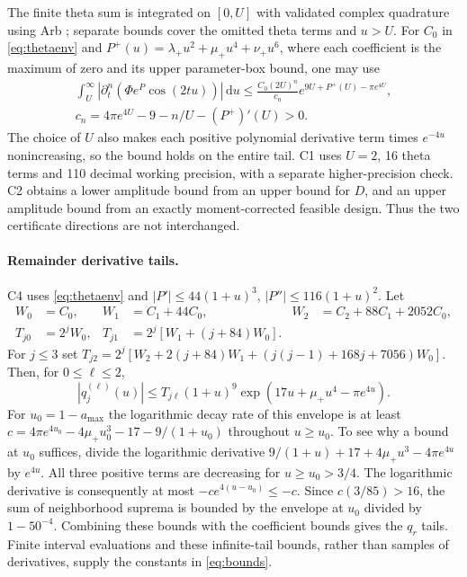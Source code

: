 \documentclass[11pt,a4paper]{article}
\numberwithin{equation}{section}
\theoremstyle{remark}\newtheorem{remark}[theorem]{Remark}
\newcommand{\dd}{\,\mathrm du}
\begin{document}
The finite theta sum is integrated on $[0,U]$ with validated complex
quadrature using Arb \cite{johansson,johanssonintegration}; separate bounds
cover the omitted theta terms and $u>U$. For $C_0$ in
\eqref{eq:thetaenv} and $P^+(u)=\lambda_+u^2+\mu_+u^4+\nu_+u^6$, where
each coefficient is the maximum of zero and its upper parameter-box bound,
one may use
\begin{equation}
 \begin{gathered}
 \int_U^\infty |\partial_t^n(\Phi e^P\cos(2tu))|\dd
 \le\frac{C_0(2U)^n}{c_n}e^{9U+P^+(U)-\pi e^{4U}},\\
 c_n=4\pi e^{4U}-9-n/U-(P^+)'(U)>0.
 \end{gathered}
\end{equation}
The choice of $U$ also makes each positive polynomial derivative term
times $e^{-4u}$ nonincreasing, so the bound holds on the entire tail.
C1 uses $U=2$, 16 theta terms and 110 decimal working precision, with a
separate higher-precision check. C2 obtains a lower amplitude bound from
an upper bound for $D$, and an upper amplitude bound from an exactly
moment-corrected feasible design. Thus the two certificate directions
are not interchanged.

\paragraph{Remainder derivative tails.}
C4 uses \eqref{eq:thetaenv} and $|P'|\le44(1+u)^3$,
$|P''|\le116(1+u)^2$. Let
\begin{align}
 W_0&=C_0,& W_1&=C_1+44C_0,& W_2&=C_2+88C_1+2052C_0,\\
 T_{j0}&=2^jW_0,& T_{j1}&=2^j[W_1+(j+84)W_0].
\end{align}
For $j\le3$ set
$T_{j2}=2^j[W_2+2(j+84)W_1+(j(j-1)+168j+7056)W_0]$.
Then, for $0\le\ell\le2$,
\begin{equation}
 |q_j^{(\ell)}(u)|\le T_{j\ell}(1+u)^9
 \exp(17u+\mu_+u^4-\pi e^{4u}).
\end{equation}
For $u_0=1-a_{\max}$ the logarithmic decay rate of this envelope is at
least $c=4\pi e^{4u_0}-4\mu_+u_0^3-17-9/(1+u_0)$ throughout $u\ge u_0$.
To see why a bound at $u_0$ suffices, divide the logarithmic derivative
$9/(1+u)+17+4\mu_+u^3-4\pi e^{4u}$ by $e^{4u}$.
All three positive terms are decreasing for $u\ge u_0>3/4$.
The logarithmic derivative is consequently at most
$-c e^{4(u-u_0)}\le-c$. Since $c(3/85)>16$, the sum of neighborhood suprema is bounded by the
envelope at $u_0$ divided by $1-50^{-4}$. Combining these bounds with the
coefficient bounds gives the $q_r$ tails. Finite interval evaluations
and these infinite-tail bounds, rather than samples of derivatives,
supply the constants in \eqref{eq:bounds}.
\end{document}
